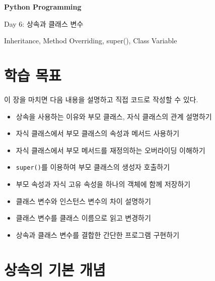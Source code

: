 \documentclass[11pt,a4paper]{article}
\begin{document}
\begin{titlepage}
    \centering
    \vspace*{3cm}

    {\Huge\bfseries Python Programming\par}
    \vspace{0.8cm}
    {\LARGE Day 6: 상속과 클래스 변수\par}

    \vspace{2cm}

    {\large Inheritance, Method Overriding, super(), Class Variable\par}

    \vfill
\end{titlepage}

\tableofcontents
\newpage

\section{학습 목표}

\begin{learningbox}
이 장을 마치면 다음 내용을 설명하고 직접 코드로 작성할 수 있다.
\begin{itemize}[leftmargin=1.5em]
    \item 상속을 사용하는 이유와 부모 클래스, 자식 클래스의 관계 설명하기
    \item 자식 클래스에서 부모 클래스의 속성과 메서드 사용하기
    \item 자식 클래스에서 부모 메서드를 재정의하는 오버라이딩 이해하기
    \item \texttt{super()}를 이용하여 부모 클래스의 생성자 호출하기
    \item 부모 속성과 자식 고유 속성을 하나의 객체에 함께 저장하기
    \item 클래스 변수와 인스턴스 변수의 차이 설명하기
    \item 클래스 변수를 클래스 이름으로 읽고 변경하기
    \item 상속과 클래스 변수를 결합한 간단한 프로그램 구현하기
\end{itemize}
\end{learningbox}

\section{상속의 기본 개념}
\end{document}
